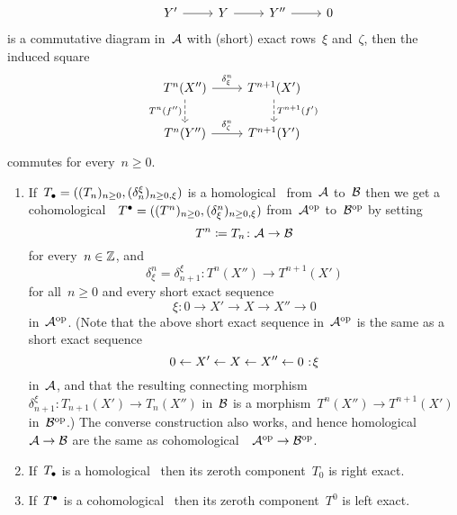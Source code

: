 \begin{definition}
\begin{enumerate}
\begin{enumerate}[label=(C$\delta$\arabic*)]
\[\begin{tikzcd}
              & Y'
                \arrow{r}
              & Y
                \arrow{r}
              & Y''
                \arrow{r}
              & 0
            \end{tikzcd}
          \]
          is a commutative diagram in~$\mathcal{A}$ with (short) exact rows~$\xi$ and~$\zeta$, then the induced square
          \[
            \begin{tikzcd}
                T^n(X'')
                \arrow{r}[above]{\delta_\xi^n}
                \arrow[dashed]{d}[left]{T^n(f'')}
              & T^{n+1}(X')
                \arrow[dashed]{d}[right]{T^{n+1}(f')}
              \\
                T^n(Y'')
                \arrow{r}[above]{\delta_\zeta^n}
              & T^{n+1}(Y')
            \end{tikzcd}
          \]
          commutes for every~$n \geq 0$.
      \end{enumerate}
  \end{enumerate}
\end{definition}


\begin{remark}
  \leavevmode
  \begin{enumerate}
    \item
      If~$T_\bullet = ((T_n)_{n \geq 0}, (\delta_n^\xi)_{n \geq 0, \xi})$ is a homological~{\deltafun} from~$\mathcal{A}$ to~$\mathcal{B}$ then we get a cohomological~{\deltafun}~$T^\bullet = ((T^n)_{n \geq 0}, (\delta_\xi^n)_{n \geq 0, \xi})$ from~$\mathcal{A}^{\mathrm{op}}$ to~$\mathcal{B}^{\mathrm{op}}$ by setting
      \[
                  T^n
        \coloneqq  T_n
        \colon    \mathcal{A}
        \to       \mathcal{B}
      \]
      for every~$n \in \mathbb{Z}$, and
      \[
                \delta_\xi^n
        =       \delta^\xi_{n+1}
        \colon  T^n(X'')
        \to     T^{n+1}(X')
      \]
      for all~$n \geq 0$ and every short exact sequence
      \[
        \xi
        \colon
        0
        \to
        X'
        \to
        X
        \to
        X''
        \to
        0
      \]
      in~$\mathcal{A}^{\mathrm{op}}$.
      (Note that the above short exact sequence in~$\mathcal{A}^{\mathrm{op}}$ is the same as a short exact sequence
      \[
        0
        \from
        X'
        \from
        X
        \from
        X''
        \from
        0
        \cocolon
        \xi
      \]
      in~$\mathcal{A}$, and that the resulting connecting morphism~$\delta^\xi_{n+1} \colon T_{n+1}(X') \to T_n(X'')$ in~$\mathcal{B}$ is a morphism~$T^n(X'') \to T^{n+1}(X')$ in~$\mathcal{B}^{\mathrm{op}}$.)
      The converse construction also works, and hence homological~{\deltafuns}~$\mathcal{A} \to \mathcal{B}$ are the same as cohomological~{\deltafuns}~$\mathcal{A}^{\mathrm{op}} \to \mathcal{B}^{\mathrm{op}}$.
    \item
      If~$T_\bullet$ is a homological~{\deltafun} then its zeroth component~$T_0$ is right exact.
    \item
      If~$T^\bullet$ is a cohomological~{\deltafun} then its zeroth component~$T^0$ is left exact.
  \end{enumerate}
\end{remark}


